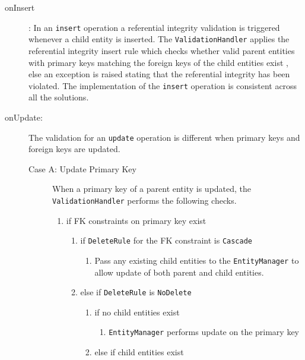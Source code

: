 		\begin{description}
		\item[onInsert]: 
		In an \texttt{insert} operation a referential
		integrity validation is triggered whenever a child entity is  inserted. 
		The \texttt{ValidationHandler} applies the referential integrity insert
		rule which checks whether  valid parent entities with
		primary keys matching the foreign keys of the child entities exist , else an
		exception is raised stating that the referential integrity has been violated.
		The implementation of the \texttt{insert} operation is consistent across all the
		solutions. 
		
		\item[onUpdate:] The validation for an \texttt{update} operation is different
		when primary keys and foreign keys are updated. 
		\begin{description}
		\item[Case A: Update Primary Key] When a  primary key of a
		parent entity is updated, the \texttt{ValidationHandler} performs the
		following checks.
		\renewcommand{\labelenumii}{\arabic{enumi}.\arabic{enumii}}
		\renewcommand{\labelenumiii}{\arabic{enumi}.\arabic{enumii}.\arabic{enumiii}}
		\begin{enumerate}
		  \item if \ac{FK} constraints on primary key exist
		  	\begin{enumerate}		  	
		    \item if \texttt{DeleteRule} for the \ac{FK} constraint is
		    \texttt{Cascade}
		    	\begin{enumerate}
		    	  \item Pass any existing child entities to the \texttt{EntityManager} to
		    	  allow update of both parent and child entities.
				\end{enumerate}
			\item else if \texttt{DeleteRule}  is \texttt{NoDelete}
				\begin{enumerate}
				  \item if no child entities exist
				  		\begin{enumerate}
				  		  \item \texttt{EntityManager} performs update on  the primary key
				  		\end{enumerate}
				  \item else if child entities exist
				   		\begin{enumerate}

\end{enumerate}
\end{enumerate}
\end{enumerate}
\end{enumerate}
\end{description}
\end{description}
